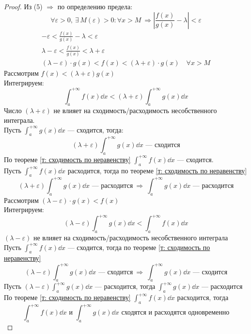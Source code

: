 \begin{proof}
    Из (5) $\Rightarrow$ по определению предела:
    \[ \forall \varepsilon > 0,\ \exists\, M(\varepsilon) > 0\colon \forall x > M\ \Rightarrow \left| \frac{f(x)}{g(x)} - \lambda \right| < \varepsilon \] \vspace{-\topsep}
    \begin{gather*}
        -\varepsilon < \frac{f(x)}{g(x)} - \lambda < \varepsilon\\
        \lambda - \varepsilon < \frac{f(x)}{g(x)} < \lambda + \varepsilon\\
        (\lambda - \varepsilon)\cdot g(x) < f(x) < (\lambda + \varepsilon)\cdot g(x)\quad \forall x > M \tag{$*$}
    \end{gather*}
     Рассмотрим $f(x) < (\lambda + \varepsilon) g(x)$\\
    Интегрируем:
    \[ 
        \int_{a}^{+\infty} f(x)\dd{x} < (\lambda + \varepsilon) \int_{a}^{+\infty} g(x)\dd{x}
    \]
    Число $(\lambda + \varepsilon)$ не влияет на сходимость/расходимость несобственного интеграла.\\[1ex]
    Пусть $\int_{a}^{+\infty} g(x)\dd{x}$ --- сходится, тогда:
    \[
        (\lambda + \varepsilon) \int_{a}^{+\infty}g(x)\dd{x} \text{ --- сходится}
    \]
    По теореме \ref{т: сходимость по неравенству} $\int_{a}^{+\infty} f(x)\dd{x}$ --- сходится.\\[1ex]
    Пусть $\int_{a}^{+\infty} f(x)\dd{x}$ расходится, тогда по теореме \ref{т: сходимость по неравенству}
    \[
        (\lambda + \varepsilon) \int_{a}^{+\infty}g(x)\dd{x} \text{ --- расходится}\ \Rightarrow\ \int_{a}^{+\infty} g(x)\dd{x} \text{ --- расходится}
    \]
     Рассмотрим $(\lambda - \varepsilon)\cdot g(x) < f(x)$\\
    Интегрируем:
    \[
        (\lambda - \varepsilon) \int_{a}^{+\infty} g(x)\dd{x} < \int_{a}^{+\infty} f(x)\dd{x}
    \]
    $(\lambda - \varepsilon)$ не влияет на сходимость/расходимость несобственного интеграла\\[1ex]
    Пусть $\int_{a}^{+\infty} f(x)\dd{x}$ --- сходится, тогда по теореме \ref{т: сходимость по неравенству} \[
        (\lambda - \varepsilon)\int_{a}^{+\infty} g(x)\dd{x} \text{ --- сходится}\ \Rightarrow\ \int_{a}^{+\infty} g(x)\dd{x} \text{ --- сходится}
    \]
    Пусть $(\lambda - \varepsilon) \int_{a}^{+\infty} g(x)\dd{x}$ --- расходится, тогда $\int_{a}^{+\infty} g(x)\dd{x}$ --- расходится\\[1ex]
    По теореме \ref{т: сходимость по неравенству} $\int_{a}^{+\infty} f(x)\dd{x}$ расходится, тогда
    \[
        \int_{a}^{+\infty} f(x)\dd{x} \text{ и } \int_{a}^{+\infty} g(x)\dd{x} \text{ сходятся и расходятся одновременно}
    \]
\end{proof}

